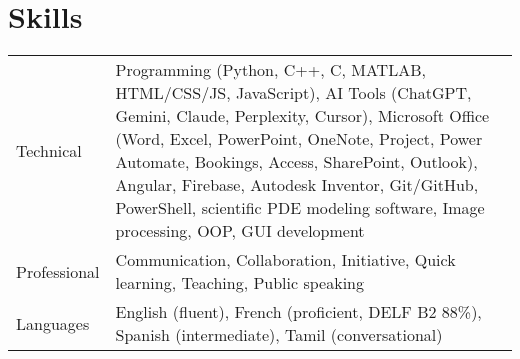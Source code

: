 \documentclass[a4paper,10pt]{article}
\begin{document}
\section{Skills}
\begin{tabularx}{\linewidth}{@{}l X@{}}
Technical &  \normalsize{Programming (Python, C++, C, MATLAB, HTML/CSS/JS, JavaScript), AI Tools (ChatGPT, Gemini, Claude, Perplexity, Cursor), Microsoft Office (Word, Excel, PowerPoint, OneNote, Project, Power Automate, Bookings, Access, SharePoint, Outlook), Angular, Firebase, Autodesk Inventor, Git/GitHub, PowerShell, scientific PDE modeling software, Image processing, OOP, GUI development}\\
Professional  &  \normalsize{Communication, Collaboration, Initiative, Quick learning, Teaching, Public speaking}\\  
Languages & \normalsize{English (fluent), French (proficient, DELF B2 88\%), Spanish (intermediate), Tamil (conversational)}\\
\end{tabularx}


% 
\end{document}
